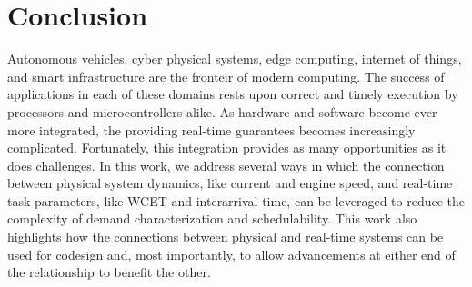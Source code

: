 \section{Conclusion}   \label{chap:conclusion}

Autonomous vehicles, cyber physical systems, edge computing, internet of things, and smart infrastructure are the fronteir of modern computing.
The success of applications in each of these domains rests upon correct and timely execution by processors and microcontrollers alike.
As hardware and software become ever more integrated, the providing real-time guarantees becomes increasingly complicated.
Fortunately, this integration provides as many opportunities as it does challenges.
In this work, we address several ways in which the connection between physical system dynamics, like current and engine speed, and real-time task parameters, like WCET and interarrival time, can be leveraged to reduce the complexity of demand characterization and schedulability.
This work also highlights how the connections between physical and real-time systems can be used for codesign and, most importantly, to allow advancements at either end of the relationship to benefit the other.